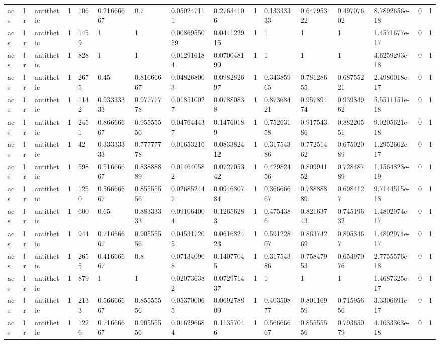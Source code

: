 \begin{tabular}{llllllllllllllll}
acs & lr & antithetic & 1 & 106 & 0.21666667 & 0.7 & 0.050247111 & 0.27634106 & 1 & 0.13333333 & 0.64795322 & 0.49707602 & 8.7892656e-18 & 0 & 1 \\
acs & lr & antithetic & 1 & 1459 & 1 & 1 & 0.0086955059 & 0.044122915 & 1 & 1 & 1 & 1 & 1.4571677e-17 & 0 & 1 \\
acs & lr & antithetic & 1 & 828 & 1 & 1 & 0.012916184 & 0.070048199 & 1 & 1 & 1 & 1 & 4.6259293e-18 & 0 & 1 \\
acs & lr & antithetic & 1 & 2675 & 0.45 & 0.81666667 & 0.048268003 & 0.098282697 & 1 & 0.34385965 & 0.78128655 & 0.68755221 & 2.4980018e-17 & 0 & 1 \\
acs & lr & antithetic & 1 & 1142 & 0.93333333 & 0.97777778 & 0.018510027 & 0.07880838 & 1 & 0.87368421 & 0.95789474 & 0.93984962 & 5.5511151e-18 & 0 & 1 \\
acs & lr & antithetic & 1 & 2451 & 0.86666667 & 0.95555556 & 0.047644437 & 0.14760189 & 1 & 0.75263158 & 0.91754386 & 0.88220551 & 9.0205621e-18 & 0 & 1 \\
acs & lr & antithetic & 1 & 42 & 0.33333333 & 0.77777778 & 0.01653216 & 0.083382412 & 1 & 0.31754386 & 0.77251462 & 0.67502089 & 1.2952602e-17 & 0 & 1 \\
acs & lr & antithetic & 1 & 598 & 0.51666667 & 0.83888889 & 0.014640582 & 0.072705342 & 1 & 0.42982456 & 0.80994152 & 0.72848789 & 1.1564823e-19 & 0 & 1 \\
acs & lr & antithetic & 1 & 1250 & 0.56666667 & 0.85555556 & 0.026852447 & 0.094680784 & 1 & 0.36666667 & 0.78888889 & 0.6984127 & 9.7144515e-18 & 0 & 1 \\
acs & lr & antithetic & 1 & 600 & 0.65 & 0.88333333 & 0.091064004 & 0.12656283 & 1 & 0.4754386 & 0.82163743 & 0.74519632 & 1.4802974e-17 & 0 & 1 \\
acs & lr & antithetic & 1 & 944 & 0.71666667 & 0.90555556 & 0.045317205 & 0.061682423 & 1 & 0.59122807 & 0.86374269 & 0.8053467 & 1.4802974e-17 & 0 & 1 \\
acs & lr & antithetic & 1 & 2655 & 0.41666667 & 0.8 & 0.071340908 & 0.14077045 & 1 & 0.31754386 & 0.75847953 & 0.65497076 & 2.7755576e-18 & 0 & 1 \\
acs & lr & antithetic & 1 & 879 & 1 & 1 & 0.020736382 & 0.072971437 & 1 & 1 & 1 & 1 & 1.4687325e-17 & 0 & 1 \\
acs & lr & antithetic & 1 & 2133 & 0.56666667 & 0.85555556 & 0.053700065 & 0.069278809 & 1 & 0.40350877 & 0.80116959 & 0.71595656 & 3.3306691e-17 & 0 & 1 \\
acs & lr & antithetic & 1 & 1226 & 0.71666667 & 0.90555556 & 0.016296684 & 0.11357046 & 1 & 0.56666667 & 0.85555556 & 0.79365079 & 4.1633363e-18 & 0 & 1 \\

\end{tabular}
